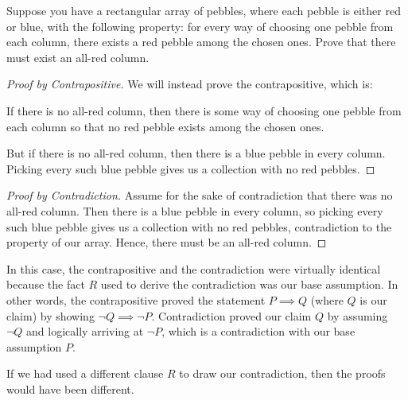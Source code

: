 \documentclass[11 pt]{scrartcl}
\begin{document}
\begin{example}
    Suppose you have a rectangular array of pebbles, where each pebble is either red or blue, with the following property: for every way of choosing one pebble from each column, there exists a red pebble among the chosen ones. Prove that there must exist an all-red column.
\end{example}
\begin{proof}[Proof by Contrapositive]
     We will instead prove the contrapositive, which is: 

     \begin{center} If there is no all-red column, then there is some way of choosing one pebble from each column so that no red pebble exists among the chosen ones.\end{center}

     But if there is no all-red column, then there is a blue pebble in every column. Picking every such blue pebble gives us a collection with no red pebbles. 
\end{proof}
\begin{proof}[Proof by Contradiction]
    Assume for the sake of contradiction that there was no all-red column. Then there is a blue pebble in every column, so picking every such blue pebble gives us a collection with no red pebbles, contradiction to the property of our array. Hence, there must be an all-red column. 
\end{proof}

In this case, the contrapositive and the contradiction were virtually identical because the fact $R$ used to derive the contradiction was our base assumption. In other words, the contrapositive proved the statement $P\implies Q$ (where $Q$ is our claim) by showing $\neg Q \implies \neg P$. Contradiction proved our claim $Q$ by assuming $\neg Q$ and logically arriving at $\neg P$, which is a contradiction with our base assumption $P$. 

If we had used a different clause $R$ to draw our contradiction, then the proofs would have been different. 
\end{document}
